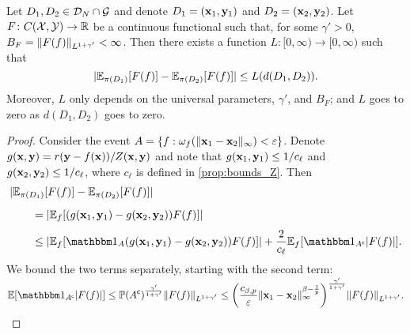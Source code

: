 \documentclass[12pt]{report}
\begin{document}
\begin{proposition} \label{prop:Lipschitzness_functional}
    Let $D_1, D_2 \in \mathcal{D}_N \cap \mathcal{G}$ and denote $D_1 = (\mathbf{x}_1, \mathbf{y}_1)$ and $D_2 = (\mathbf{x}_2, \mathbf{y}_2)$.
    Let $F\colon C(\mathcal{X}, \mathcal{Y}) \to \mathbb{R}$ be a continuous functional such that, for some $\gamma' > 0$, $B_F = \lVert F(f)\rVert_{L^{1+\gamma'}} < \infty$.
    Then there exists a function $L\colon[0,\infty) \to [0, \infty)$ such that
    \begin{equation}
        \lvert\mathbb{E}_{\pi(D_1)}[F(f)] - \mathbb{E}_{\pi(D_2)}[F(f)]\rvert
        \le L(d(D_1, D_2)).
    \end{equation}
    Moreover, $L$ only depends on the universal parameters, $\gamma'$, and $B_F$; and $L$ goes to zero as $d(D_1, D_2)$ goes to zero.
\end{proposition}
\begin{proof}
    Consider the event $A = \{f : 
        \omega_f(\lVert\mathbf{x}_1 - \mathbf{x}_2\rVert_\infty) < \varepsilon
    \}$.
    Denote $g(\mathbf{x}, \mathbf{y}) = r(\mathbf{y} - f(\mathbf{x})) / Z(\mathbf{x}, \mathbf{y})$ and
    note that $g(\mathbf{x}_1, \mathbf{y}_1) \le 1 /c_\ell$ and $g(\mathbf{x}_2, \mathbf{y}_2) \le 1/c_\ell$, where $c_\ell$ is defined in \cref{prop:bounds_Z}.
    Then
    \begin{align}
        &\abs{\E_{\pi(D_1)}[F(f)] - \E_{\pi(D_2)}[F(f)]} \nonumber \\
        &\qquad = \vphantom{\frac11} \abs{\E_f\sbrac{
            \parens{
                g(\vx_1, \vy_1)
                - g(\vx_2, \vy_2)
            }
            F(f)
        }} \\
        &\qquad \le \abs{\E_f\sbrac{
            \ind_A\parens{
                g(\vx_1, \vy_1)
                - g(\vx_2, \vy_2)
            }
            F(f)
        }} + \frac2{c_\ell} \E_f[\ind_{A^\c}\abs{F(f)}].
    \end{align}
    We bound the two terms separately, starting with the second term:
    \begin{equation}
        \E[\ind_{A^\c} \abs{F(f)}]
        \le
            \P(A^\c)^{\frac{\gamma'}{1 + \gamma'}} 
            \norm{F(f)}_{L^{1 + \gamma'}}
        \le
            \parens*{
                \frac{c_{\beta, p}}{\e} \norm{\vx_1 - \vx_2}_\infty^{\beta - \frac{1}{p}}
            }^{\smash{\frac{\gamma'}{1 + \gamma'}}}
            \norm{F(f)}_{L^{1 + \gamma'}}.

\end{equation}
\end{proof}
\end{document}
